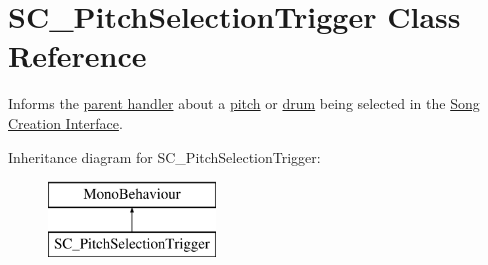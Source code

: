 \hypertarget{class_s_c___pitch_selection_trigger}{}\section{S\+C\+\_\+\+Pitch\+Selection\+Trigger Class Reference}
\label{class_s_c___pitch_selection_trigger}


Informs the \hyperlink{group___doc_s_c___p_s_c}{parent handler} about a \hyperlink{group___music_enums_ga508f69b199ea518f935486c990edac1d}{pitch} or \hyperlink{group___music_enums_gade475b4382c7066d1af13e7c13c029b6}{drum} being selected in the \hyperlink{group___doc_s_c}{Song Creation Interface}.  


Inheritance diagram for S\+C\+\_\+\+Pitch\+Selection\+Trigger\+:\begin{figure}[H]
\begin{center}
\leavevmode
\includegraphics[height=2.000000cm]{class_s_c___pitch_selection_trigger}
\end{center}
\end{figure}
